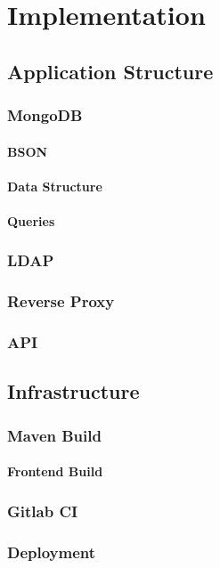 \chapter{Implementation}

\section{Application Structure}
\subsection{MongoDB}
\subsubsection{BSON}
\subsubsection{Data Structure}
\subsubsection{Queries}
\subsection{LDAP}
\subsection{Reverse Proxy}
\subsection{API}

\section{Infrastructure}
\subsection{Maven Build}
\subsubsection{Frontend Build}
\subsection{Gitlab CI}
\subsection{Deployment}

